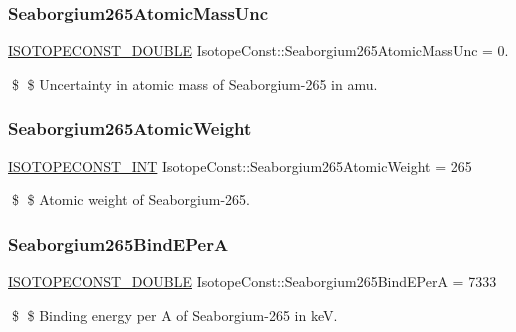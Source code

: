 \subsubsection{\texorpdfstring{Seaborgium265\+Atomic\+Mass\+Unc}{Seaborgium265AtomicMassUnc}}
{\footnotesize\ttfamily \mbox{\hyperlink{group___isotope_const-_macros_ga8f45a7272ce02c0b4c65c44636ed719a}{I\+S\+O\+T\+O\+P\+E\+C\+O\+N\+S\+T\+\_\+\+D\+O\+U\+B\+LE}} Isotope\+Const\+::\+Seaborgium265\+Atomic\+Mass\+Unc = 0.}

\$ \$ Uncertainty in atomic mass of Seaborgium-\/265 in amu. \mbox{\label{group___isotope_const-_seaborgium-_sg265_ga9c99302deac65cc8394a3ae4f77cfa28}} 
\subsubsection{\texorpdfstring{Seaborgium265\+Atomic\+Weight}{Seaborgium265AtomicWeight}}
{\footnotesize\ttfamily \mbox{\hyperlink{group___isotope_const-_macros_ga5f18360b3e99483a35c32d789e62621c}{I\+S\+O\+T\+O\+P\+E\+C\+O\+N\+S\+T\+\_\+\+I\+NT}} Isotope\+Const\+::\+Seaborgium265\+Atomic\+Weight = 265}

\$ \$ Atomic weight of Seaborgium-\/265. \mbox{\label{group___isotope_const-_seaborgium-_sg265_ga0f997638486887d7c95b567fc66841b8}} 
\subsubsection{\texorpdfstring{Seaborgium265\+Bind\+E\+PerA}{Seaborgium265BindEPerA}}
{\footnotesize\ttfamily \mbox{\hyperlink{group___isotope_const-_macros_ga8f45a7272ce02c0b4c65c44636ed719a}{I\+S\+O\+T\+O\+P\+E\+C\+O\+N\+S\+T\+\_\+\+D\+O\+U\+B\+LE}} Isotope\+Const\+::\+Seaborgium265\+Bind\+E\+PerA = 7333}

\$ \$ Binding energy per A of Seaborgium-\/265 in keV. \mbox{\label{group___isotope_const-_seaborgium-_sg265_gadf583490246c8dec43e79cacb15769f9}} 
